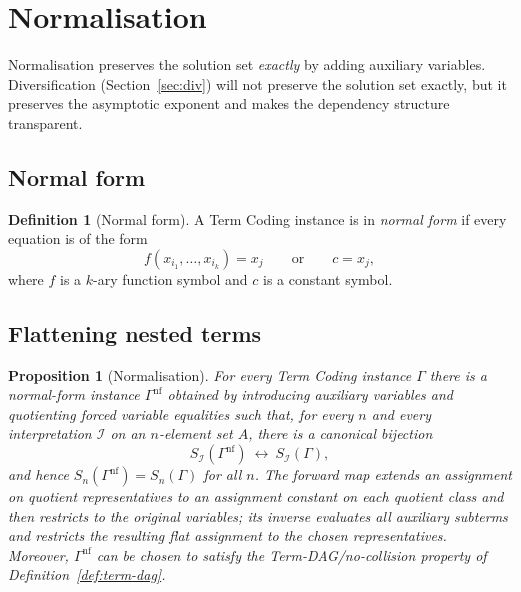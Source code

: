 \documentclass[11pt]{article}
\theoremstyle{plain}
\newtheorem{proposition}[theorem]{Proposition}
\theoremstyle{definition}
\theoremstyle{definition}
\newtheorem{definition}[theorem]{Definition}
\theoremstyle{remark}
\newcommand{\A}{A}
\newcommand{\Sn}{S_n}
\newcommand{\SI}{S_{\mathcal I}}
\begin{document}
\section{Normalisation}
\label{sec:normalisation}

Normalisation preserves the solution set \emph{exactly} by adding auxiliary variables.
Diversification (Section~\ref{sec:div}) will not preserve the solution set exactly, but it preserves the
asymptotic exponent and makes the dependency structure transparent.

\subsection{Normal form}

\begin{definition}[Normal form]
\label{def:normal-form}
A Term Coding instance is in \emph{normal form} if every equation is of the form
\[
  f(x_{i_1},\dots,x_{i_k})=x_j\qquad\text{or}\qquad c=x_j,
\]
where $f$ is a $k$-ary function symbol and $c$ is a constant symbol.
\end{definition}

\subsection{Flattening nested terms}

\begin{proposition}[Normalisation]
\label{prop:normalisation}
For every Term Coding instance $\Gamma$ there is a normal-form instance $\Gamma^{\mathrm{nf}}$ obtained by
introducing auxiliary variables and quotienting forced variable equalities such that, for every $n$ and every
interpretation $\mathcal I$ on an $n$-element set $\A$, there is a canonical bijection
\[
\SI(\Gamma^{\mathrm{nf}})\ \longleftrightarrow\ \SI(\Gamma),
\]
and hence $\Sn(\Gamma^{\mathrm{nf}})=\Sn(\Gamma)$ for all $n$.
The forward map extends an assignment on quotient representatives to an assignment constant on each quotient class
and then restricts to the original variables; its inverse evaluates all auxiliary subterms and restricts the resulting
flat assignment to the chosen representatives.
Moreover, $\Gamma^{\mathrm{nf}}$ can be chosen to satisfy the Term-DAG/no-collision property of
Definition~\ref{def:term-dag}.
\end{proposition}
\end{document}
